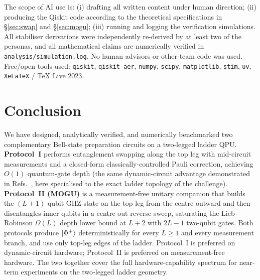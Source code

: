 \documentclass[11pt,a4paper]{article}
\theoremstyle{definition}
\newcommand{\Phip}{\ket{\Phi^+}}
\begin{document}
The scope of AI use is: (i) drafting all written content under human
direction; (ii) producing the Qiskit code according to the theoretical
specifications in \S\ref{sec:swap} and \S\ref{sec:mogu}; (iii) running
and logging the verification simulations. All stabiliser derivations
were independently re-derived by at least two of the personas, and all
mathematical claims are numerically verified in
\texttt{analysis/simulation.log}. No human advisors or other-team code
was used. Free/open tools used: \texttt{qiskit}, \texttt{qiskit-aer},
\texttt{numpy}, \texttt{scipy}, \texttt{matplotlib}, \texttt{stim},
\texttt{uv}, \texttt{XeLaTeX} / TeX Live 2023.

\section{Conclusion}

We have designed, analytically verified, and numerically benchmarked
two complementary Bell-state preparation circuits on a two-legged
ladder QPU. \textbf{Protocol~I} performs entanglement swapping along
the top leg with mid-circuit measurements and a closed-form
classically-controlled Pauli correction, achieving $O(1)$ quantum-gate
depth (the same dynamic-circuit advantage demonstrated in
Refs.~\cite{Baumer2024,Song2024}, here specialised to the exact ladder
topology of the challenge). \textbf{Protocol~II (MOGU)} is a
measurement-free unitary companion that builds the $(L+1)$-qubit GHZ
state on the top leg from the centre outward and then disentangles
inner qubits in a centre-out reverse sweep, saturating the
Lieb-Robinson $\Omega(L)$ depth lower bound at $L+2$ with $2L-1$
two-qubit gates. Both protocols produce $\Phip$ deterministically for
every $L\ge 1$ and every measurement branch, and use only top-leg
edges of the ladder. Protocol~I is preferred on dynamic-circuit
hardware; Protocol~II is preferred on measurement-free hardware. The
two together cover the full hardware-capability spectrum for near-term
experiments on the two-legged ladder geometry.
\end{document}
